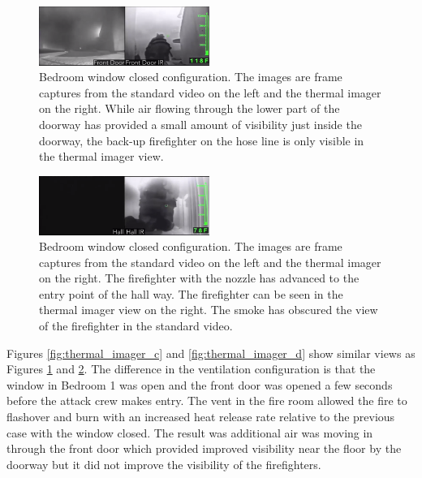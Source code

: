 \documentclass[12pt,oneside]{book}
\begin{document}
\begin{figure}[H]
\centering
\includegraphics[width=0.495\textwidth]{../0_Images/Tactical_Considerations/Thermal_Imager/Exp6FDpair.PNG}
\caption[Thermal Imager A]{Bedroom window closed configuration. The images are frame captures from the standard video on the left and the thermal imager on the right. While air flowing through the lower part of the doorway has provided a small amount of visibility just inside the doorway, the back-up firefighter on the hose line is only visible in the thermal imager view.}
\label{fig:thermal_imager_a}
\end{figure}

\begin{figure}[H]
\centering
\includegraphics[width=0.495\textwidth]{../0_Images/Tactical_Considerations/Thermal_Imager/Exp6Hallpair.png}
\caption[Thermal Imager B]{Bedroom window closed configuration.  The images are frame captures from the standard video on the left and the thermal imager on the right. The firefighter with the nozzle has advanced to the entry point of the hall way. The firefighter can be seen in the thermal imager view on the right. The smoke has obscured the view of the firefighter in the standard video.}
\label{fig:thermal_imager_b}
\end{figure}

Figures \ref{fig:thermal_imager_c} and \ref{fig:thermal_imager_d} show similar views as Figures \ref{fig:thermal_imager_a} and \ref{fig:thermal_imager_b}. The difference in the ventilation configuration is that the window in Bedroom 1 was open and the front door was opened a few seconds before the attack crew makes entry.  The vent in the fire room allowed the fire to flashover and burn with an increased heat release rate relative to the previous case with the window closed. The result was additional air was moving in through the front door which provided improved visibility near the floor by the doorway but it did not improve the visibility of the firefighters. 
\end{document}
